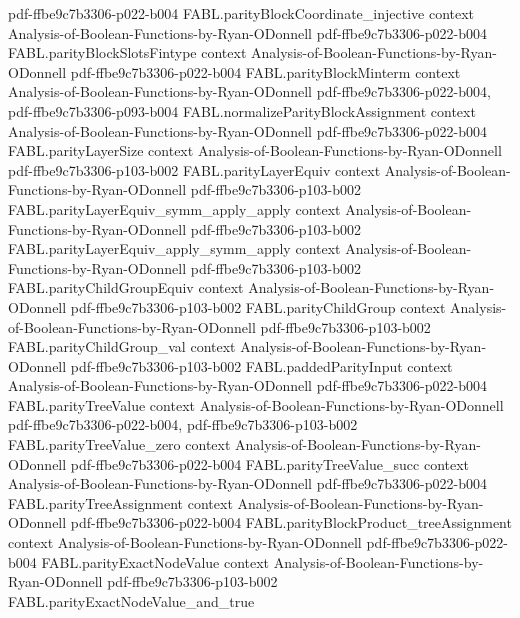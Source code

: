 \begin{theorem}
  {pdf-ffbe9c7b3306-p022-b004}
\proofstep
  {FABL.parityBlockCoordinate_injective}
  {context}
  {Analysis-of-Boolean-Functions-by-Ryan-ODonnell}
  {pdf-ffbe9c7b3306-p022-b004}
\proofstep
  {FABL.parityBlockSlotsFintype}
  {context}
  {Analysis-of-Boolean-Functions-by-Ryan-ODonnell}
  {pdf-ffbe9c7b3306-p022-b004}
\proofstep
  {FABL.parityBlockMinterm}
  {context}
  {Analysis-of-Boolean-Functions-by-Ryan-ODonnell}
  {pdf-ffbe9c7b3306-p022-b004,
    pdf-ffbe9c7b3306-p093-b004}
\proofstep
  {FABL.normalizeParityBlockAssignment}
  {context}
  {Analysis-of-Boolean-Functions-by-Ryan-ODonnell}
  {pdf-ffbe9c7b3306-p022-b004}
\proofstep
  {FABL.parityLayerSize}
  {context}
  {Analysis-of-Boolean-Functions-by-Ryan-ODonnell}
  {pdf-ffbe9c7b3306-p103-b002}
\proofstep
  {FABL.parityLayerEquiv}
  {context}
  {Analysis-of-Boolean-Functions-by-Ryan-ODonnell}
  {pdf-ffbe9c7b3306-p103-b002}
\proofstep
  {FABL.parityLayerEquiv_symm_apply_apply}
  {context}
  {Analysis-of-Boolean-Functions-by-Ryan-ODonnell}
  {pdf-ffbe9c7b3306-p103-b002}
\proofstep
  {FABL.parityLayerEquiv_apply_symm_apply}
  {context}
  {Analysis-of-Boolean-Functions-by-Ryan-ODonnell}
  {pdf-ffbe9c7b3306-p103-b002}
\proofstep
  {FABL.parityChildGroupEquiv}
  {context}
  {Analysis-of-Boolean-Functions-by-Ryan-ODonnell}
  {pdf-ffbe9c7b3306-p103-b002}
\proofstep
  {FABL.parityChildGroup}
  {context}
  {Analysis-of-Boolean-Functions-by-Ryan-ODonnell}
  {pdf-ffbe9c7b3306-p103-b002}
\proofstep
  {FABL.parityChildGroup_val}
  {context}
  {Analysis-of-Boolean-Functions-by-Ryan-ODonnell}
  {pdf-ffbe9c7b3306-p103-b002}
\proofstep
  {FABL.paddedParityInput}
  {context}
  {Analysis-of-Boolean-Functions-by-Ryan-ODonnell}
  {pdf-ffbe9c7b3306-p022-b004}
\proofstep
  {FABL.parityTreeValue}
  {context}
  {Analysis-of-Boolean-Functions-by-Ryan-ODonnell}
  {pdf-ffbe9c7b3306-p022-b004,
    pdf-ffbe9c7b3306-p103-b002}
\proofstep
  {FABL.parityTreeValue_zero}
  {context}
  {Analysis-of-Boolean-Functions-by-Ryan-ODonnell}
  {pdf-ffbe9c7b3306-p022-b004}
\proofstep
  {FABL.parityTreeValue_succ}
  {context}
  {Analysis-of-Boolean-Functions-by-Ryan-ODonnell}
  {pdf-ffbe9c7b3306-p022-b004}
\proofstep
  {FABL.parityTreeAssignment}
  {context}
  {Analysis-of-Boolean-Functions-by-Ryan-ODonnell}
  {pdf-ffbe9c7b3306-p022-b004}
\proofstep
  {FABL.parityBlockProduct_treeAssignment}
  {context}
  {Analysis-of-Boolean-Functions-by-Ryan-ODonnell}
  {pdf-ffbe9c7b3306-p022-b004}
\proofstep
  {FABL.parityExactNodeValue}
  {context}
  {Analysis-of-Boolean-Functions-by-Ryan-ODonnell}
  {pdf-ffbe9c7b3306-p103-b002}
\proofstep
  {FABL.parityExactNodeValue_and_true}

\end{theorem}
